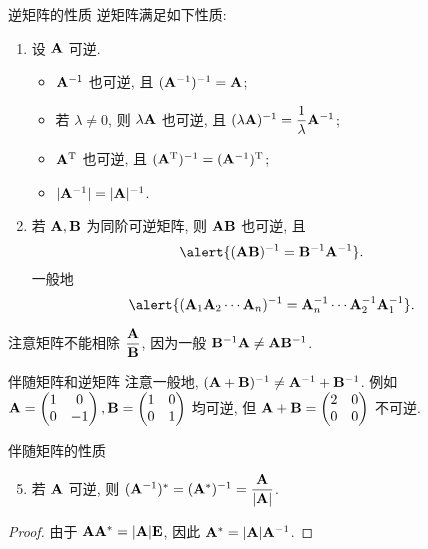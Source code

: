 \begin{frame}{逆矩阵的性质}
	\onslide<+->
	逆矩阵满足如下性质:
	\begin{enumerate}
		\item 设 ${\mathbf{A}}$ 可逆.
		\begin{itemize}
			\item ${\mathbf{A}}^{-1}$ 也可逆, 且 $({\mathbf{A}}^{-1})^{-1}={\mathbf{A}}$;
			\item 若 $\lambda\neq 0$, 则 $\lambda{\mathbf{A}}$ 也可逆, 且 $(\lambda{\mathbf{A}})^{-1}=\dfrac1\lambda{\mathbf{A}}^{-1}$;
			\item ${\mathbf{A}}^{\mathrm{T}}$ 也可逆, 且 $({\mathbf{A}}^{\mathrm{T}})^{-1}=({\mathbf{A}}^{-1})^{\mathrm{T}}$;
			\item $|{\mathbf{A}}^{-1}|=|{\mathbf{A}}|^{-1}$.
		\end{itemize}
		\item 若 ${\mathbf{A}},{\mathbf{B}}$ 为同阶可逆矩阵, 则 ${\mathbf{A}}{\mathbf{B}}$ 也可逆, 且
		\[\alert{(\bfA\bfB)^{-1}=\bfB^{-1}\bfA^{-1}}.\]
		一般地
		\[\alert{(\bfA_1\bfA_2\cdots\bfA_n)^{-1}=\bfA_n^{-1}\cdots\bfA_2^{-1}\bfA_1^{-1}}.\]
	\end{enumerate}
	\onslide<+->
	注意矩阵不能相除 $\dfrac{{\mathbf{A}}}{{\mathbf{B}}}$, 因为一般 ${\mathbf{B}}^{-1}{\mathbf{A}}\neq{\mathbf{A}}{\mathbf{B}}^{-1}$.
\end{frame}


\begin{frame}{伴随矩阵和逆矩阵}
	\onslide<+->
	注意一般地, $({\mathbf{A}}+{\mathbf{B}})^{-1}\neq{\mathbf{A}}^{-1}+{\mathbf{B}}^{-1}$.
	\onslide<+->
	例如 ${\mathbf{A}}=\begin{pmatrix}
		1&0\\0&-1
	\end{pmatrix},{\mathbf{B}}=\begin{pmatrix}
		1&0\\0&1
	\end{pmatrix}$ 均可逆, 但 ${\mathbf{A}}+{\mathbf{B}}=\begin{pmatrix}
		2&0\\0&0
	\end{pmatrix}$ 不可逆.
	\onslide<+->
	\begin{block}{伴随矩阵的性质}
		\begin{enumerate}
			\setcounter{enumi}{4}
			\item 若 ${\mathbf{A}}$ 可逆, 则 $({\mathbf{A}}^{-1})^*=({\mathbf{A}}^*)^{-1}=\dfrac{{\mathbf{A}}}{|{\mathbf{A}}|}$.
		\end{enumerate}
	\end{block}
	\onslide<+->
	\begin{proof}
		由于 ${\mathbf{A}}{\mathbf{A}}^*=|{\mathbf{A}}|{\mathbf{E}}$, 因此 ${\mathbf{A}}^*=|{\mathbf{A}}|{\mathbf{A}}^{-1}$.
		\onslide<+->{于是
		\[(\bfA^{-1})^*=|\bfA^{-1}|(\bfA^{-1})^{-1}=\frac{\bfA}{|\bfA|},\quad\visible<+->{(\bfA^*)^{-1}=(|\bfA|\bfA^{-1})^{-1}=\frac{\bfA}{|\bfA|}.}\qedhere\]
		}
		\vspace{-\baselineskip}
	\end{proof}
\end{frame}


